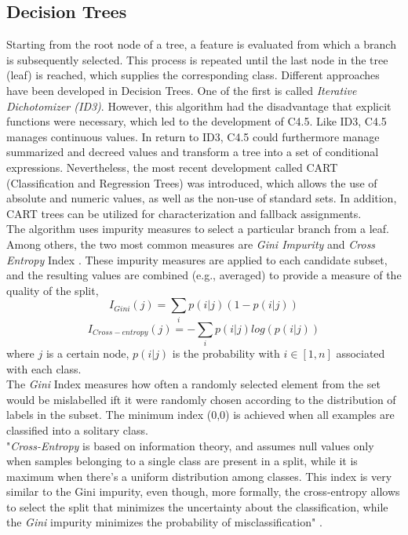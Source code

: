 \documentclass[a4paper, 11pt,titlepage,oneside,openany]{book}
\begin{document}
\subsection{Decision Trees}
Starting from the root node of a tree, a feature is evaluated from which a branch is subsequently selected. This process is repeated until the last node in the tree (leaf) is reached, which supplies the corresponding class. Different approaches have been developed in Decision Trees. One of the first is called \textit{Iterative Dichotomizer (ID3)}. However, this algorithm had the disadvantage that explicit functions were necessary, which led to the development of C4.5. Like ID3, C4.5 manages continuous values. In return to ID3, C4.5 could furthermore manage summarized and decreed values and transform a tree into a set of conditional expressions. Nevertheless, the most recent development called CART (Classification and Regression Trees) was introduced, which allows the use of absolute and numeric values, as well as the non-use of standard sets. In addition, CART trees can be utilized for characterization and fallback assignments. \cite{algorithms2}\\
\noindent The algorithm uses impurity measures to select a particular branch from a leaf. Among others, the two most common measures are \textit{Gini Impurity} and \textit{Cross Entropy} Index \cite{algorithms}.  These impurity measures are  applied to each candidate subset, and the resulting values are combined (e.g., averaged) to provide a measure of the quality of the split,
\[
I_{Gini}(j)=\sum_{i}p(i|j)(1-p(i|j))
\]
\[
I_{Cross-entropy}(j)=-\sum_{i}p(i|j)log(p(i|j))
\]
where $j$ is a certain node, $p(i|j)$ is the probability with $i \in [1,n]$ associated with each class.\\
\noindent The \textit{Gini} Index measures how often a randomly selected element from the set would be mislabelled ift it were randomly chosen according to the distribution of labels in the subset. The minimum index (0,0) is achieved when all examples are classified into a solitary class.\\
\noindent "\textit{Cross-Entropy} is based on information theory, and assumes null values only when samples belonging to a single class are present in a split, while it is maximum when there's a uniform distribution among classes. This index is very similar to the Gini impurity, even though, more formally, the cross-entropy allows to select the split that minimizes the uncertainty about the classification, while the \textit{Gini} impurity minimizes the probability of misclassification" \cite{algorithms}.
\end{document}
